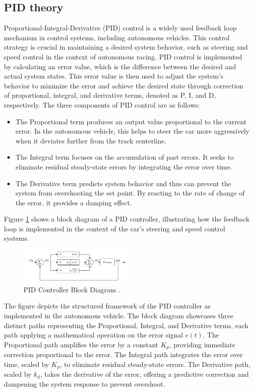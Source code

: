 \documentclass[conference]{IEEEtran}
\begin{document}
\subsection{PID theory}

Proportional-Integral-Derivative (PID) control is a widely used feedback loop mechanism in control systems, including autonomous vehicles. This control strategy is crucial in maintaining a desired system behavior, such as steering and speed control in the context of autonomous racing. PID control is implemented by calculating an error value, which is the difference between the desired and actual system states. This error value is then used to adjust the system's behavior to minimize the error and achieve the desired state through correction of proportional, integral, and derivative terms, denoted as P, I, and D, respectively. The three components of PID control are as follows:

\begin{itemize}
	\item The Proportional term produces an output value proportional to the current error. In the autonomous vehicle, this helps to steer the car more aggressively when it deviates further from the track centerline.
	\item The Integral term focuses on the accumulation of past errors. It seeks to eliminate residual steady-state errors by integrating the error over time.
	\item The Derivative term predicts system behavior and thus can prevent the system from overshooting the set point. By reacting to the rate of change of the error, it provides a damping effect.
\end{itemize}

Figure \ref{fig:PID} shows a block diagram of a PID controller, illustrating how the feedback loop is implemented in the context of the car's steering and speed control systems.

\begin{figure}[htbp]
	\centerline{\includegraphics[width=0.5\textwidth]{images/pid.png}}
	\caption{PID Controller Block Diagram \cite{controlSystems}.}
	\label{fig:PID}
\end{figure}

The figure depicts the structured framework of the PID controller as implemented in the autonomous vehicle. The block diagram showcases three distinct paths representing the Proportional, Integral, and Derivative terms, each path applying a mathematical operation on the error signal $e(t)$. The Proportional path amplifies the error by a constant $K_p$, providing immediate correction proportional to the error. The Integral path integrates the error over time, scaled by $K_p$, to eliminate residual steady-state errors. The Derivative path, scaled by $k_d$, takes the derivative of the error, offering a predictive correction and dampening the system response to prevent overshoot.
\end{document}
